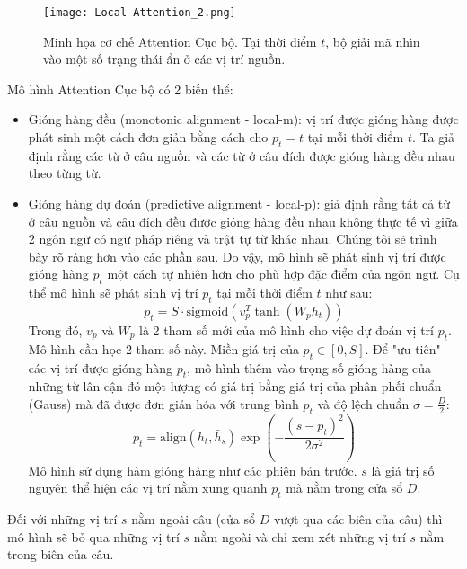 \begin{figure}
	\centering
	\texttt{[image: Local-Attention\_2.png]}
	\caption[Minh họa cơ chế Attention Cục bộ.]{Minh họa cơ chế Attention Cục bộ. Tại thời điểm $t$, bộ giải mã nhìn vào một số trạng thái ẩn ở các vị trí nguồn.}
	\label{fig_Local_Attention}
\end{figure}

Mô hình Attention Cục bộ có 2 biến thể:
\begin{itemize}
	\item Gióng hàng đều (monotonic alignment - local-m): vị trí được gióng hàng được phát sinh một cách đơn giản bằng cách cho $p_t = t$ tại mỗi thời điểm $t$. Ta giả định rằng các từ ở câu nguồn và các từ ở câu đích được gióng hàng đều nhau theo từng từ.
	\item Gióng hàng dự đoán (predictive alignment - local-p): giả định rằng tất cả từ ở câu nguồn và câu đích đều được gióng hàng đều nhau không thực tế vì giữa 2 ngôn ngữ có ngữ pháp riêng và trật tự từ khác nhau. Chúng tôi sẽ trình bày rõ ràng hơn vào các phần sau. Do vậy, mô hình sẽ phát sinh vị trí được gióng hàng $p_t$ một cách tự nhiên hơn cho phù hợp đặc điểm của ngôn ngữ. Cụ thể mô hình sẽ phát sinh vị trí $p_t$ tại mỗi thời điểm $t$ như sau:
	\begin{equation}
	p_t = S \cdot \text{sigmoid} (v^T_p \tanh(W_p h_t))
	\end{equation}
	Trong đó, $v_p$ và $W_p$ là 2 tham số mới của mô hình cho việc dự đoán vị trí $p_t$. Mô hình cần học 2 tham số này. Miền giá trị của $p_t \in [0, S]$.
	Để "ưu tiên" các vị trí được gióng hàng $p_t$, mô hình thêm vào trọng số gióng hàng của những từ lân cận đó một lượng có giá trị bằng giá trị của phân phối chuẩn (Gauss) mà đã được đơn giản hóa với trung bình $p_t$ và độ lệch chuẩn $\sigma = \frac{D}{2}$:
	\begin{equation}
	p_t = \text{align}(h_t, \bar{h}_s)\exp\left(-\frac{(s-p_t)^2}{2\sigma^2}\right)
	\end{equation}
	Mô hình sử dụng hàm gióng hàng như các phiên bản trước. $s$ là giá trị số nguyên thể hiện các vị trí nằm xung quanh $p_t$ mà nằm trong cửa sổ $D$.
\end{itemize}
 Đối với những vị trí $s$ nằm ngoài câu (cửa sổ $D$ vượt qua các biên của câu) thì mô hình sẽ bỏ qua những vị trí $s$ nằm ngoài và chỉ xem xét những vị trí $s$ nằm trong biên của câu.
 
